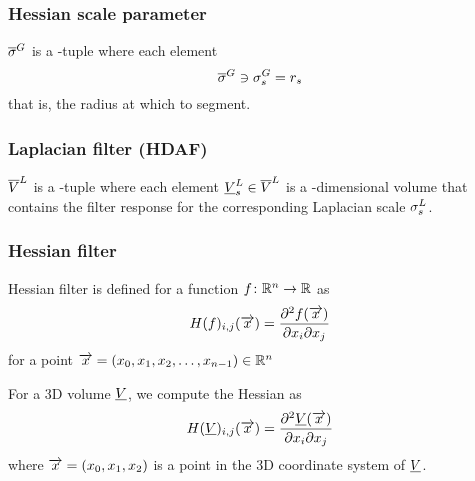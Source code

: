 \documentclass[12pt]{article}
\begin{document}

\subsubsection{Hessian scale parameter}

\(\overline{\sigma}^{G}\) is a \Dim{\RadiiScalesName}-tuple where each element
\begin{equation*}
	\overline{\sigma}^{G} \ni \sigma^{G}_{s}{} = r_{s}{}
\end{equation*}
that is, the radius at which to segment.

\subsubsection{Laplacian filter (HDAF)}

\(\overline{V}^{L}\) is a \Dim{\RadiiScalesName}-tuple
where each element \(\underline{V}^{L}_{s} \in \overline{V}^{L}\)
is a \Dim{\InputVolumeName}-dimensional volume
that contains the filter response for the corresponding Laplacian scale \(\sigma^{L}_{s}\).

\subsubsection{Hessian filter}


Hessian filter is defined for a function \(f\colon \mathbb{R}^{n} \to \mathbb{R}\)
as
\begin{equation*}
	H(f)_{i,j}(\overrightarrow{x}) = \frac{\partial{}^{2} f(\overrightarrow{x})}{\partial{}x_{i}\partial{}x_{j}}
\end{equation*}
for a point \(\overrightarrow{x} = (x_0, x_1, x_2, \dotsc, x_{n-1}) \in \mathbb{R}^{n}\)

For a 3D volume \(\underline{V}\), we compute the Hessian as
\begin{equation*}
	H(\underline{V})_{i,j}(\overrightarrow{x}) = \frac{\partial{}^{2} \underline{V}(\overrightarrow{x})}{\partial{}x_{i}\partial{}x_{j}}
\end{equation*}
where \(\overrightarrow{x} = (x_{0}, x_{1}, x_{2})\) is a point in the 3D
coordinate system of \(\underline{V}\).

\end{document}
